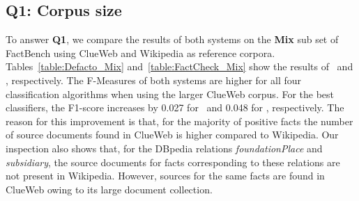 \subsection{ \textbf{Q1:} Corpus size}

To answer \textbf{Q1}, we compare the results of both systems on the \textbf{Mix} sub set of FactBench using ClueWeb and Wikipedia as reference corpora. Tables~\ref{table:Defacto_Mix} and~\ref{table:FactCheck_Mix} show the results of \DeFacto\ and \FactCheck, respectively. The F-Measures of both systems are higher for all four classification algorithms when using the larger ClueWeb corpus. For the best classifiers, the F1-score increases by 0.027 for \DeFacto\ and 0.048 for \FactCheck, respectively. The reason for this improvement is that, for the majority of positive facts the number of source documents found in ClueWeb is higher compared to Wikipedia. Our inspection also shows that, for the DBpedia relations \textit{foundationPlace} and \textit{subsidiary}, the source documents for facts corresponding to these relations are not present in Wikipedia. However, sources for the same facts are found in ClueWeb owing to its large document collection.

